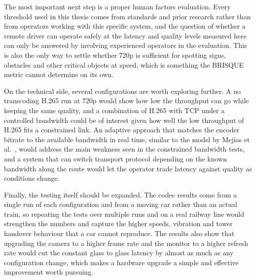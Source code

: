 The most important next step is a proper human factors evaluation. Every threshold used in this thesis comes from standards and prior research rather than from operators working with this specific system, and the question of whether a remote driver can operate safely at the latency and quality levels measured here can only be answered by involving experienced operators in the evaluation. This is also the only way to settle whether 720p is sufficient for spotting signs, obstacles and other critical objects at speed, which is something the BRISQUE metric cannot determine on its own.

On the technical side, several configurations are worth exploring further. A no transcoding H.265 run at 720p would show how low the throughput can go while keeping the same quality, and a combination of H.265 with TCP under a controlled bandwidth could be of interest given how well the low throughput of H.265 fits a constrained link. An adaptive approach that matches the encoder bitrate to the available bandwidth in real time, similar to the model by Mejías et al.~\cite{mejias2024}, would address the main weakness seen in the constrained bandwidth tests, and a system that can switch transport protocol depending on the known bandwidth along the route would let the operator trade latency against quality as conditions change.

Finally, the testing itself should be expanded. The codec results come from a single run of each configuration and from a moving car rather than an actual train, so repeating the tests over multiple runs and on a real railway line would strengthen the numbers and capture the higher speeds, vibration and tower handover behaviour that a car cannot reproduce. The results also show that upgrading the camera to a higher frame rate and the monitor to a higher refresh rate would cut the constant glass to glass latency by almost as much as any configuration change, which makes a hardware upgrade a simple and effective improvement worth pursuing.